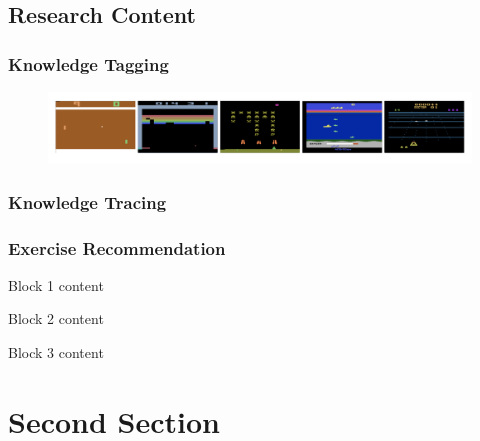 \documentclass{beamer}
\begin{document}



\subsection{Research Content}

\begin{frame}
  \frametitle{Knowledge Tagging}
  \begin{figure}
    \includegraphics[width=1.0\textwidth]{figures/atari.png}
  \end{figure}
\end{frame}


\begin{frame}
  \frametitle{Knowledge Tracing}

\end{frame}


\begin{frame}
  \frametitle{Exercise Recommendation}
  \begin{block}{Block 1}
    content
  \end{block}

  \begin{block}{Block 2}
    content
  \end{block}

  \begin{block}{Block 3}
    content
  \end{block}
\end{frame}

\section{Second Section}
\begin{frame}
  \
\end{frame}
\end{document}

